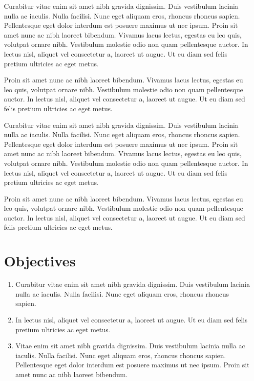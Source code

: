 Curabitur vitae enim sit amet nibh gravida dignissim. Duis vestibulum lacinia nulla ac iaculis. Nulla facilisi. Nunc eget aliquam eros, rhoncus rhoncus sapien. Pellentesque eget dolor interdum est posuere maximus ut nec ipsum. Proin sit amet nunc ac nibh laoreet bibendum. Vivamus lacus lectus, egestas eu leo quis, volutpat ornare nibh. Vestibulum molestie odio non quam pellentesque auctor. In lectus nisl, aliquet vel consectetur a, laoreet ut augue. Ut eu diam sed felis pretium ultricies ac eget metus.

Proin sit amet nunc ac nibh laoreet bibendum. Vivamus lacus lectus, egestas eu leo quis, volutpat ornare nibh. Vestibulum molestie odio non quam pellentesque auctor. In lectus nisl, aliquet vel consectetur a, laoreet ut augue. Ut eu diam sed felis pretium ultricies ac eget metus.


Curabitur vitae enim sit amet nibh gravida dignissim. Duis vestibulum lacinia nulla ac iaculis. Nulla facilisi. Nunc eget aliquam eros, rhoncus rhoncus sapien. Pellentesque eget dolor interdum est posuere maximus ut nec ipsum. Proin sit amet nunc ac nibh laoreet bibendum. Vivamus lacus lectus, egestas eu leo quis, volutpat ornare nibh. Vestibulum molestie odio non quam pellentesque auctor. In lectus nisl, aliquet vel consectetur a, laoreet ut augue. Ut eu diam sed felis pretium ultricies ac eget metus.

Proin sit amet nunc ac nibh laoreet bibendum. Vivamus lacus lectus, egestas eu leo quis, volutpat ornare nibh. Vestibulum molestie odio non quam pellentesque auctor. In lectus nisl, aliquet vel consectetur a, laoreet ut augue. Ut eu diam sed felis pretium ultricies ac eget metus.
 

\section{Objectives}

\begin{enumerate}
	\item Curabitur vitae enim sit amet nibh gravida dignissim. Duis vestibulum lacinia nulla ac iaculis. Nulla facilisi. Nunc eget aliquam eros, rhoncus rhoncus sapien.
	\item In lectus nisl, aliquet vel consectetur a, laoreet ut augue. Ut eu diam sed felis pretium ultricies ac eget metus.
	\item Vitae enim sit amet nibh gravida dignissim. Duis vestibulum lacinia nulla ac iaculis. Nulla facilisi. Nunc eget aliquam eros, rhoncus rhoncus sapien. Pellentesque eget dolor interdum est posuere maximus ut nec ipsum. Proin sit amet nunc ac nibh laoreet bibendum. 
\end{enumerate}


